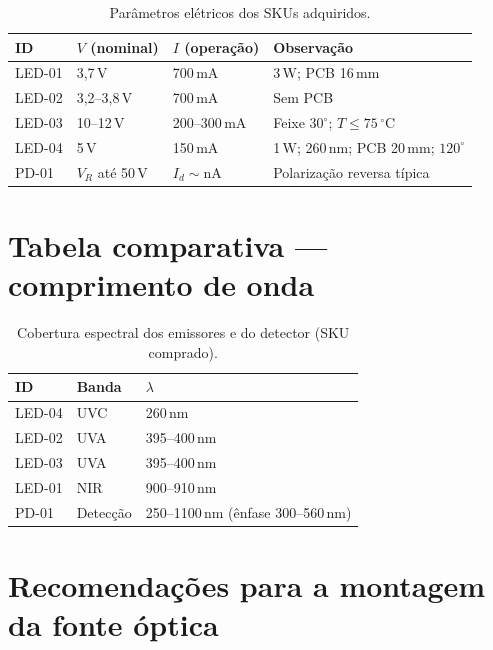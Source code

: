 \documentclass[11pt,a4paper]{article}
\begin{document}
\begin{table}[ht]
\centering
\caption{Parâmetros elétricos dos SKUs adquiridos.}
\label{tab:eletrico}
\begin{tabular}{@{}llll@{}}
\toprule
ID & $V$ (nominal) & $I$ (operação) & Observação \\
\midrule
LED-01 & 3{,}7\,V & 700\,mA & 3\,W; PCB 16\,mm \\
LED-02 & 3{,}2--3{,}8\,V & 700\,mA & Sem PCB \\
LED-03 & 10--12\,V & 200--300\,mA & Feixe $30^\circ$; $T\leq 75\,^\circ\mathrm{C}$ \\
LED-04 & 5\,V & 150\,mA & 1\,W; 260\,nm; PCB 20\,mm; $120^\circ$ \\
PD-01 & $V_R$ até 50\,V & $I_d\sim$nA & Polarização reversa típica \\
\bottomrule
\end{tabular}
\end{table}

\section{Tabela comparativa --- comprimento de onda}

\begin{table}[ht]
\centering
\caption{Cobertura espectral dos emissores e do detector (SKU comprado).}
\label{tab:lambda}
\begin{tabular}{@{}llp{5.5cm}@{}}
\toprule
ID & Banda & $\lambda$ \\
\midrule
LED-04 & UVC & 260\,nm \\
LED-02 & UVA & 395--400\,nm \\
LED-03 & UVA & 395--400\,nm \\
LED-01 & NIR & 900--910\,nm \\
PD-01 & Detecção & 250--1100\,nm (ênfase 300--560\,nm) \\
\bottomrule
\end{tabular}
\end{table}

\section{Recomendações para a montagem da fonte óptica}
\end{document}
